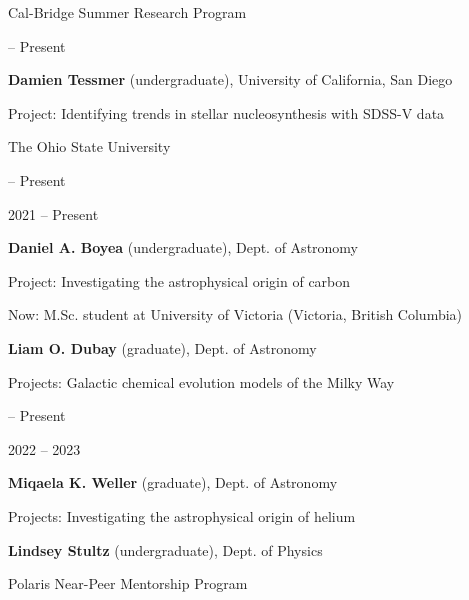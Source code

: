 \documentclass[cv.tex]{subfiles}
\begin{document}
{\color{themecolor} \large Cal-Bridge Summer Research Program}
\par\noindent
\parbox{0.18\textwidth}{%
	 -- Present \par
	\null \par
}
\hspace{1mm}
\parbox{0.8\textwidth}{%
	\vspace{1mm}
	\textbf{Damien Tessmer} (undergraduate), University of California,
	San Diego \par
	Project: Identifying trends in stellar nucleosynthesis with SDSS-V data \par
}

\vspace{5mm}
\noindent
{\color{themecolor} \large The Ohio State University}
\par\noindent
\parbox{0.18\textwidth}{%
	 -- Present \par
	\null \par
	\null \par
	2021 -- Present \par
	\null \par
}
\hspace{1mm}
\parbox{0.8\textwidth}{%
	\vspace{1mm}
	\textbf{Daniel A. Boyea} (undergraduate), Dept. of Astronomy \par
	Project: Investigating the astrophysical origin of carbon \par
	Now: M.Sc. student at University of Victoria (Victoria, British Columbia) \par
	\textbf{Liam O. Dubay} (graduate), Dept. of Astronomy \par
	Projects: Galactic chemical evolution models of the Milky Way \par
}

\newpage
\noindent
\parbox{0.18\textwidth}{%
	 -- Present \par
	\null \par
	2022 -- 2023 \par
	\null
}
\hspace{1mm}
\parbox{0.8\textwidth}{%
	\vspace{1mm}
	\textbf{Miqaela K. Weller} (graduate), Dept. of Astronomy \par
	Projects: Investigating the astrophysical origin of helium \par
	\textbf{Lindsey Stultz} (undergraduate), Dept. of Physics \par
	Polaris Near-Peer Mentorship Program
}
\end{document}
